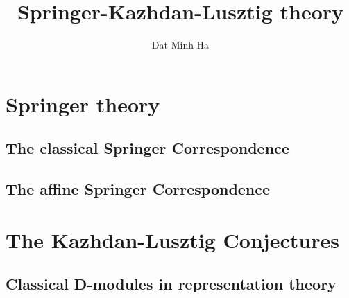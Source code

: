 

\setcounter{section}{-1}





	\title{Springer-Kazhdan-Lusztig theory}
	
	\author{Dat Minh Ha}
	\maketitle
	
	\begin{abstract}
	    
	\end{abstract}
	
	{
      \hypersetup{} 
      \tableofcontents %
    }
    
    \part{Springer theory}
        \chapter{The classical Springer Correspondence}
            \begin{abstract}
                
            \end{abstract}
            
            \minitoc
            
            
        
        \chapter{The affine Springer Correspondence}
    
    \part{The Kazhdan-Lusztig Conjectures}
        \chapter{Classical D-modules in representation theory}
            \begin{abstract}
            
            \end{abstract}
            
